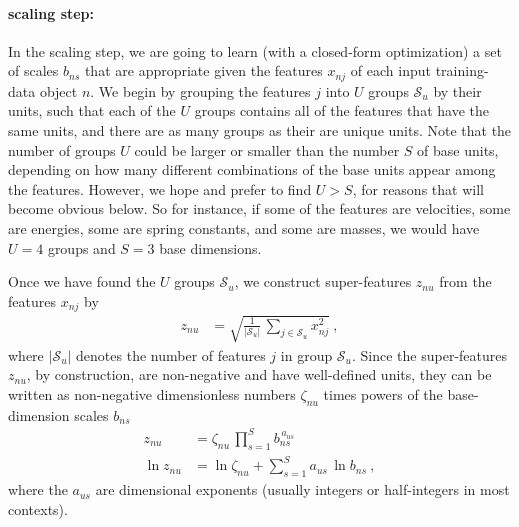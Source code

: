 \documentclass{article}
\newcommand{\set}[1]{\mathcal{#1}}
\newcommand{\setS}{\set{S}}
\begin{document}
\paragraph{scaling step:}
In the scaling step, we are going to learn (with a closed-form optimization) a set of scales $b_{ns}$ that are appropriate given the features $x_{nj}$ of each input training-data object $n$.
We begin by grouping the features $j$ into $U$ groups $\setS_u$ by their units, such that each of the $U$ groups contains all of the features that have the same units, and there are as many groups as their are unique units.
Note that the number of groups $U$ could be larger or smaller than the number $S$ of base units, depending on how many different combinations of the base units appear among the features. However, we hope and prefer to find $U>S$, for reasons that will become obvious below.
So for instance, if some of the features are velocities, some are energies, some are spring constants, and some are masses, we would have $U=4$ groups and $S=3$ base dimensions.

Once we have found the $U$ groups $\setS_u$, we construct super-features $z_{nu}$ from the features $x_{nj}$ by
\begin{align}\label{eq:znu}
    z_{nu} &= \sqrt{\frac{1}{|\setS_u|}\,\sum_{j\in\setS_u} x_{nj}^2} ~,
\end{align}
where $|\setS_u|$ denotes the number of features $j$ in group $\setS_u$.
Since the super-features $z_{nu}$, by construction, are non-negative and have well-defined units, they can be written as non-negative dimensionless numbers $\zeta_{nu}$ times powers of the base-dimension scales $b_{ns}$
\begin{align}
    z_{nu} &= \zeta_{nu}\,\prod_{s=1}^S b_{ns}^{\,a_{us}} \\
    \ln z_{nu} &= \ln \zeta_{nu} + \sum_{s=1}^S a_{us}\,\ln b_{ns} ~,
\end{align}
where the $a_{us}$ are dimensional exponents (usually integers or half-integers in most contexts).
\end{document}

